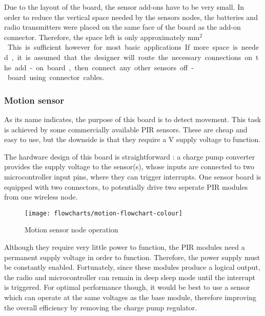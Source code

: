 Due to the layout of the board, the sensor add-ons have to be very small. In
order to reduce the vertical space needed by the sensors nodes, the batteries
and radio transmitters were placed on the same face of the board as the add-on
connector. Therefore, the space left is only approximately \unit[25x25]{mm$^2$}.
This is sufficient however for most basic applications. If more space is needed,
it is assumed that the designer will route the necessary connections on the
add-on board, then connect any other sensors off-board using connector cables.


\subsubsection{Motion sensor}


As its name indicates, the purpose of this board is to detect movement. This
task is achieved by some commercially available PIR sensors. These are cheap and
easy to use, but the downside is that they require a \unit[5]{V} supply voltage
to function.

The hardware design of this board is straightforward : a charge pump converter
provides the supply voltage to the sensor(s), whose inputs are connected to two
microcontroller input pins, where they can trigger interrupts. One sensor board
is equipped with two connectors, to potentially drive two seperate PIR modules
from one wireless node.


\begin{figure}[!h]
  \begin{center}
    \texttt{[image: flowcharts/motion-flowchart-colour]}
  \end{center}
  \caption{Motion sensor node operation}
  \label{fig:motion-flowchart}
\end{figure}

Although they require very little power to function, the PIR modules need a
permanent supply voltage in order to function. Therefore, the power supply must
be constantly enabled. Fortunately, since these modules produce a logical
output, the radio and microcontroller can remain in deep sleep mode until the
interrupt is triggered. For optimal performance though, it would be best to use
a sensor which can operate at the same voltages as the base module, therefore
improving the overall efficiency by removing the charge pump regulator.


